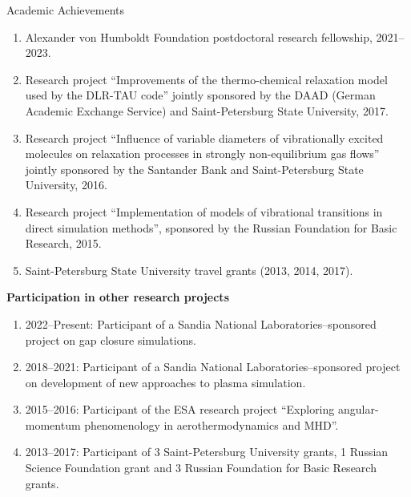 \documentclass{resume} %
\begin{document}
\begin{rSection}{Academic Achievements}
\begin{enumerate}
    \item Alexander von Humboldt Foundation postdoctoral research fellowship, 2021--2023. %
    \item Research project ``Improvements of the thermo-chemical relaxation model used by the DLR-TAU code'' jointly sponsored by the DAAD (German Academic Exchange Service) and Saint-Petersburg State University, 2017. %
    \item Research project ``Influence of variable diameters of vibrationally excited molecules on relaxation processes in strongly non-equilibrium gas flows'' jointly sponsored by the Santander Bank and Saint-Petersburg State University, 2016. %
    \item Research project ``Implementation of models of vibrational transitions in direct simulation methods'', sponsored by the Russian Foundation for Basic Research, 2015. %
    \item Saint-Petersburg State University travel grants (2013, 2014, 2017).

\end{enumerate}

{\bf Participation in other research projects}

\begin{enumerate}
    \item 2022--Present: Participant of a Sandia National Laboratories--sponsored project on gap closure simulations.
    \item 2018--2021: Participant of a Sandia National Laboratories--sponsored project on development of new approaches to plasma simulation.
    \item 2015--2016: Participant of the ESA research project ``Exploring angular-momentum phenomenology in aerothermodynamics and MHD''.
    \item 2013--2017: Participant of 3 Saint-Petersburg University grants, 1 Russian Science Foundation grant and 3 Russian Foundation for Basic Research grants.
\end{enumerate}


\end{rSection}
\end{document}
